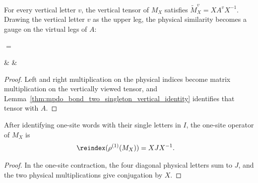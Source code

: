 \begin{lemma}%
    \label{thm:mpdo_bond_two_singleton_physical_vertical}
    \leanok
    For every vertical letter $v$, the vertical tensor of $M_X$ satisfies
    $\widetilde M_X^v=XA^vX^{-1}$.
    Drawing the vertical letter $v$ as the upper leg, the physical
    similarity becomes a gauge on the virtual legs of $A$:
    \begin{center}
        \tenkzkernel
        \begin{tenkz}[rows={wire}, cols=1, west=open, east=open]
        \end{tenkz}
        $ = $
        \begin{tenkz}[rows={wire}, cols=3, west=open, east=open]
             &  &
        \end{tenkz}
    \end{center}
\end{lemma}
\begin{proof}\leanok
    Left and right multiplication on the physical indices become matrix
    multiplication on the vertically viewed tensor, and
    Lemma~\ref{thm:mpdo_bond_two_singleton_vertical_identity} identifies
    that tensor with $A$.
\end{proof}

\begin{lemma}%
    \label{thm:mpdo_bond_two_singleton_physical_one_site}
    \leanok
    After identifying one-site words with their single letters in $I$, the
    one-site operator of $M_X$ is
    \begin{align}
        \reindex(\rho^{(1)}(M_X)) & =XJX^{-1}.
        \notag
    \end{align}
\end{lemma}
\begin{proof}\leanok
    In the one-site contraction, the four diagonal physical letters sum to
    $J$, and the two physical multiplications give conjugation by $X$.
\end{proof}

